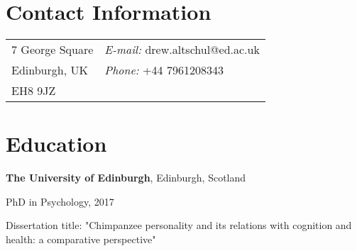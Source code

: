 \documentclass[margin,line]{res}
\newenvironment{list1}{
  \begin{list}{\ding{113}}{%
      \setlength{\itemsep}{0in}
      \setlength{\parsep}{0in} \setlength{\parskip}{0in}
      \setlength{\topsep}{0in} \setlength{\partopsep}{0in} 
      \setlength{\leftmargin}{0.17in}}}{\end{list}}
\begin{document}

\begin{resume}
\section{\sc Contact Information}
\vspace{.05in}
\begin{tabular}{@{}p{3in}p{4in}}
7 George Square  & {\it E-mail:}  drew.altschul@ed.ac.uk\\            
Edinburgh, UK & {\it Phone:} +44 7961208343 \\    
EH8 9JZ \\
\end{tabular}



%

\section{\sc Education}

{\bf The University of Edinburgh}, Edinburgh, Scotland\\
\vspace*{-.1in}
\begin{list1}
\item[] PhD in Psychology, 2017
\item[] Dissertation title: "Chimpanzee personality and its relations with cognition and health: \linebreak a comparative perspective"
\vspace*{.05in}
\end{list1}


\end{resume}
\end{document}
